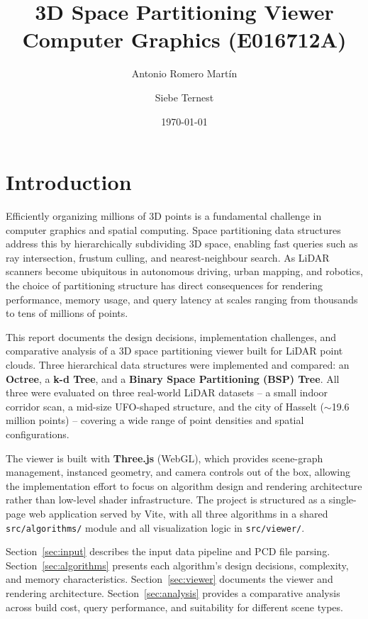 \documentclass[12pt,a4paper]{article}
\title{3D Space Partitioning Viewer\\[0.5em]
       \large Computer Graphics (E016712A)}
\author{Antonio Romero Mart\'in \and Siebe Ternest}
\date{\today}
\begin{document}
\maketitle
\newpage
\tableofcontents
\newpage

\section{Introduction}

Efficiently organizing millions of 3D points is a fundamental challenge in
computer graphics and spatial computing. Space partitioning data structures
address this by hierarchically subdividing 3D space, enabling fast queries such
as ray intersection, frustum culling, and nearest-neighbour search. As LiDAR
scanners become ubiquitous in autonomous driving, urban mapping, and robotics,
the choice of partitioning structure has direct consequences for rendering
performance, memory usage, and query latency at scales ranging from thousands
to tens of millions of points.

This report documents the design decisions, implementation challenges, and
comparative analysis of a 3D space partitioning viewer built for LiDAR point
clouds. Three hierarchical data structures were implemented and compared:
an \textbf{Octree}, a \textbf{k-d Tree}, and a \textbf{Binary Space
Partitioning (BSP) Tree}. All three were evaluated on three real-world LiDAR
datasets -- a small indoor corridor scan, a mid-size UFO-shaped structure, and
the city of Hasselt ($\sim$19.6 million points) -- covering a wide range of point
densities and spatial configurations.

The viewer is built with \textbf{Three.js} (WebGL), which provides scene-graph
management, instanced geometry, and camera controls out of the box, allowing
the implementation effort to focus on algorithm design and rendering
architecture rather than low-level shader infrastructure.
The project is structured as a single-page web application served by Vite,
with all three algorithms in a shared \texttt{src/algorithms/} module and all
visualization logic in \texttt{src/viewer/}.

Section~\ref{sec:input} describes the input data pipeline and PCD file parsing.
Section~\ref{sec:algorithms} presents each algorithm's design decisions,
complexity, and memory characteristics. Section~\ref{sec:viewer} documents the
viewer and rendering architecture. Section~\ref{sec:analysis} provides a
comparative analysis across build cost, query performance, and suitability for
different scene types.
\end{document}
